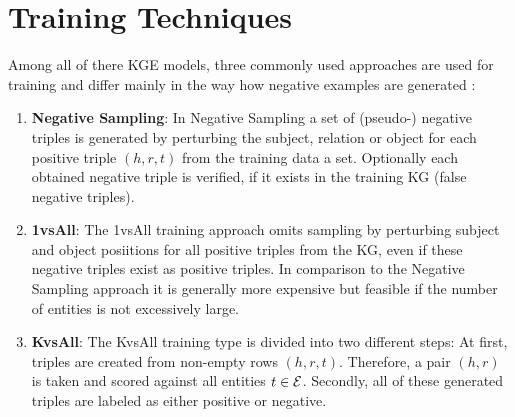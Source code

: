 \section{Training Techniques}
\label{sec:training_techniques}

Among all of there \ac{KGE} models, three commonly used approaches are used for training and differ mainly in the way how negative examples are generated \cite{Ruffinelli2020You}:

\begin{enumerate}
    \item \textbf{Negative Sampling}:  
    In Negative Sampling a set of (pseudo-) negative triples is generated by perturbing the subject, relation or object for each positive triple $(h, r, t)$ from the training data a set.
    Optionally each obtained negative triple is verified, if it exists in the training \ac{KG} (false negative triples).

    \item \textbf{1vsAll}:
    The 1vsAll training approach omits sampling by perturbing subject and object posiitions for all positive triples from the \ac{KG}, even if these negative triples exist as positive triples.
    In comparison to the Negative Sampling approach it is generally more expensive but feasible if the number of entities is not excessively large.
    
    \item \textbf{KvsAll}:
    The KvsAll training type is divided into two different steps:
    At first, triples are created from non-empty rows $(h,r,t)$.
    Therefore, a pair $(h,r)$ is taken and scored against all entities $t \in \mathcal{E}$.
    Secondly, all of these generated triples are labeled as either positive or negative.
\end{enumerate}